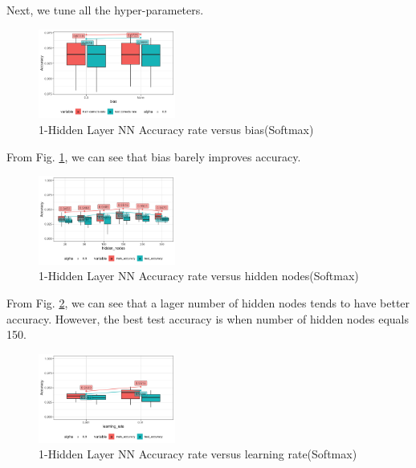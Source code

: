\documentclass[conference]{IEEEtran}
\begin{document}
Next, we tune all the hyper-parameters.
\begin{figure}[htbp]
\centerline{\includegraphics[width=0.4\textwidth]{figure/1-Hidden Layer Neural Network Accuracy rate versus bias.png}}
\caption{1-Hidden Layer NN Accuracy rate versus bias(Softmax)}
\label{1-Hidden Layer Neural Network Accuracy rate versus bias}
\end{figure}
From Fig. \ref{1-Hidden Layer Neural Network Accuracy rate versus bias}, we can see that bias barely improves accuracy.
\begin{figure}[htbp]
\centerline{\includegraphics[width=0.4\textwidth]{figure/1-Hidden Layer Neural Network Accuracy rate versus hidden_nodes.png}}
\caption{1-Hidden Layer NN Accuracy rate versus hidden nodes(Softmax)}
\label{1-Hidden Layer Neural Network Accuracy rate versus hidden nodes}
\end{figure}
From Fig. \ref{1-Hidden Layer Neural Network Accuracy rate versus hidden nodes}, we can see that a lager number of hidden nodes tends to have better accuracy. However, the best test accuracy is when number of hidden nodes equals 150.
\begin{figure}[htbp]
\centerline{\includegraphics[width=0.4\textwidth]{figure/1-Hidden Layer Neural Network Accuracy rate versus learning_rate.png}}
\caption{1-Hidden Layer NN Accuracy rate versus learning rate(Softmax)}
\label{1-Hidden Layer Neural Network Accuracy rate versus learning rate}
\end{figure}
\end{document}
